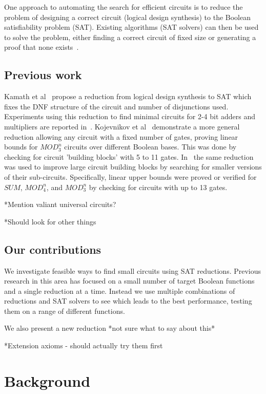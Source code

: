 \documentclass{article}
\begin{document}
One approach to automating the search for efficient circuits is to reduce the problem of designing a correct circuit (logical design synthesis) to the Boolean satisfiability problem (SAT). Existing algorithms (SAT solvers) can then be used to solve the problem, either finding a correct circuit of fixed size or generating a proof that none exists~\cite{kulikov}.

\subsection{Previous work}

Kamath et al~\cite{kamath} propose a reduction from logical design synthesis to SAT which fixes the DNF structure of the circuit and number of disjunctions used. Experiments using this reduction to find minimal circuits for 2-4 bit adders and multipliers are reported in~\cite{estrada}. Kojevnikov et al~\cite{kulikov} demonstrate a more general reduction allowing any circuit with a fixed number of gates, proving linear bounds for \(MOD^n_3\) circuits over different Boolean bases. This was done by checking for circuit 'building blocks' with 5 to 11 gates. In~\cite{kulikovlocal} the same reduction was used to improve large circuit building blocks by searching for smaller versions of their sub-circuits. Specifically, linear upper bounds were proved or verified for \(SUM\), \(MOD^n_4\), and \(MOD^n_3\) by checking for circuits with up to 13 gates.

*Mention valiant universal circuits?

*Should look for other things

\subsection{Our contributions}

We investigate feasible ways to find small circuits using SAT reductions. Previous research in this area has focused on a small number of target Boolean functions and a single reduction at a time. Instead we use multiple combinations of reductions and SAT solvers to see which leads to the best performance, testing them on a range of different functions. 

We also present a new reduction *not sure what to say about this*

*Extension axioms - should actually try them first


\section{Background}
\end{document}
